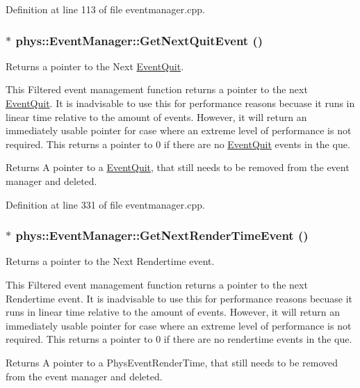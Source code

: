 Definition at line 113 of file eventmanager.cpp.

\hypertarget{classphys_1_1EventManager_ad7da09e5422b1db79ac4187ee9198d0c}{
\subsubsection[{GetNextQuitEvent}]{ $\ast$ phys::EventManager::GetNextQuitEvent ()}}
\label{da/dde/classphys_1_1EventManager_ad7da09e5422b1db79ac4187ee9198d0c}


Returns a pointer to the Next \hyperlink{classphys_1_1EventQuit}{EventQuit}. 

This Filtered event management function returns a pointer to the next \hyperlink{classphys_1_1EventQuit}{EventQuit}. It is inadvisable to use this for performance reasons becuase it runs in linear time relative to the amount of events. However, it will return an immediately usable pointer for case where an extreme level of performance is not required. This returns a pointer to 0 if there are no \hyperlink{classphys_1_1EventQuit}{EventQuit} events in the que. \begin{DoxyReturn}{Returns}
A pointer to a \hyperlink{classphys_1_1EventQuit}{EventQuit}, that still needs to be removed from the event manager and deleted. 
\end{DoxyReturn}


Definition at line 331 of file eventmanager.cpp.

\hypertarget{classphys_1_1EventManager_ae8730b039a280449af052d75f2e60b06}{
\subsubsection[{GetNextRenderTimeEvent}]{ $\ast$ phys::EventManager::GetNextRenderTimeEvent ()}}
\label{da/dde/classphys_1_1EventManager_ae8730b039a280449af052d75f2e60b06}


Returns a pointer to the Next Rendertime event. 

This Filtered event management function returns a pointer to the next Rendertime event. It is inadvisable to use this for performance reasons becuase it runs in linear time relative to the amount of events. However, it will return an immediately usable pointer for case where an extreme level of performance is not required. This returns a pointer to 0 if there are no rendertime events in the que. \begin{DoxyReturn}{Returns}
A pointer to a PhysEventRenderTime, that still needs to be removed from the event manager and deleted. 
\end{DoxyReturn}


